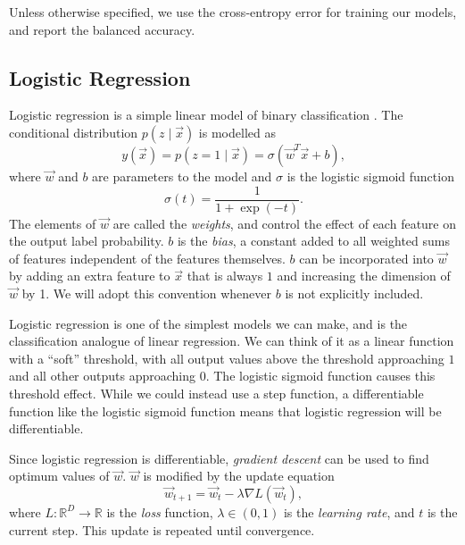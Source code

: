         Unless otherwise specified, we use the cross-entropy error for training
        our models, and report the balanced accuracy.

    \subsection{Logistic Regression}
    \label{sec:logistic-regression}

        Logistic regression is a simple linear model of binary classification
        \citep{bishop06}. The conditional distribution $p(z \mid \vec x)$ is
        modelled as
        \begin{equation}
            \label{eq:logistic-regression}
            y(\vec x) = p(z = 1 \mid \vec x) = \sigma(\vec w^T \vec x + b),
        \end{equation}
        where $\vec w$ and $b$ are parameters to the model and $\sigma$ is the
        logistic sigmoid function
        \[
            \sigma(t) = \frac{1}{1 + \exp(-t)}.
        \]
        The elements of $\vec w$ are called the \emph{weights}, and control the
        effect of each feature on the output label probability. $b$ is the
        \emph{bias}, a constant added to all weighted sums of features
        independent of the features themselves. $b$ can be incorporated into
        $\vec w$ by adding an extra feature to $\vec x$ that is always $1$ and
        increasing the dimension of $\vec w$ by 1. We will adopt this convention
        whenever $b$ is not explicitly included.

        Logistic regression is one of the simplest models we can make, and is
        the classification analogue of linear regression. We can think of it as
        a linear function with a ``soft'' threshold, with all output values
        above the threshold approaching $1$ and all other outputs approaching
        $0$. The logistic sigmoid function causes this threshold effect. While
        we could instead use a step function, a differentiable function like the
        logistic sigmoid function means that logistic regression will be
        differentiable.

        Since logistic regression is differentiable, \emph{gradient descent} can
        be used to find optimum values of $\vec w$. $\vec w$ is modified by the
        update equation
        \[
            \vec w_{t+1} = \vec w_{t} - \lambda \nabla L(\vec w_{t}),
        \]
        where $L : \mathbb{R}^D \to \mathbb{R}$ is the \emph{loss} function,
        $\lambda \in (0, 1)$ is the \emph{learning rate}, and $t$ is the current
        step. This update is repeated until convergence.

